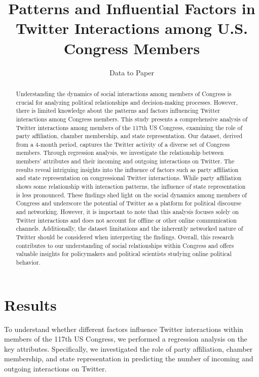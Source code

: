 \documentclass[11pt]{article}
\title{Patterns and Influential Factors in Twitter Interactions among U.S. Congress Members}
\author{Data to Paper}
\begin{document}
\maketitle
\begin{abstract}
Understanding the dynamics of social interactions among members of Congress is crucial for analyzing political relationships and decision-making processes. However, there is limited knowledge about the patterns and factors influencing Twitter interactions among Congress members. This study presents a comprehensive analysis of Twitter interactions among members of the 117th US Congress, examining the role of party affiliation, chamber membership, and state representation. Our dataset, derived from a 4-month period, captures the Twitter activity of a diverse set of Congress members. Through regression analysis, we investigate the relationship between members' attributes and their incoming and outgoing interactions on Twitter. The results reveal intriguing insights into the influence of factors such as party affiliation and state representation on congressional Twitter interactions. While party affiliation shows some relationship with interaction patterns, the influence of state representation is less pronounced. These findings shed light on the social dynamics among members of Congress and underscore the potential of Twitter as a platform for political discourse and networking. However, it is important to note that this analysis focuses solely on Twitter interactions and does not account for offline or other online communication channels. Additionally, the dataset limitations and the inherently networked nature of Twitter should be considered when interpreting the findings. Overall, this research contributes to our understanding of social relationships within Congress and offers valuable insights for policymakers and political scientists studying online political behavior.
\end{abstract}
\section*{Results}

To understand whether different factors influence Twitter interactions within members of the 117th US Congress, we performed a regression analysis on the key attributes. Specifically, we investigated the role of party affiliation, chamber membership, and state representation in predicting the number of incoming and outgoing interactions on Twitter.
\end{document}

